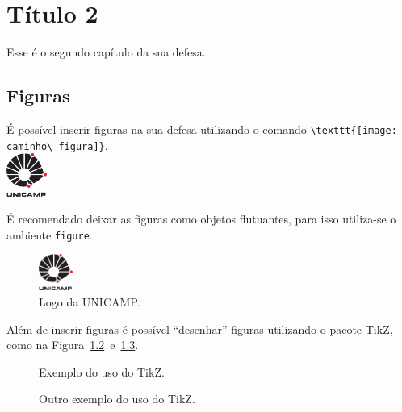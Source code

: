 \chapter{Título 2}
Esse é o segundo capítulo da sua defesa.

\section{Figuras}
É possível inserir figuras na sua defesa utilizando o comando
\lstinline+\texttt{[image: caminho\_figura]}+. \\
\includegraphics[width=0.1\textwidth]{figuras/unicamp-logo}

É recomendado deixar as figuras como objetos flutuantes, para isso
utiliza-se o ambiente \lstinline+figure+.
\begin{figure}[!htb]
  \center
  \includegraphics[width=0.1\textwidth]{figuras/unicamp-logo}
  \caption{Logo da UNICAMP.}
  \label{fig:log_unicamp}
\end{figure}

Além de inserir figuras é possível ``desenhar'' figuras
utilizando o pacote TikZ, como na
Figura~\ref{fig:exem_tikz1}~e~\ref{fig:exem_tikz2}.
\begin{figure}[!htb]
  \centering
  \caption{Exemplo do uso do TikZ.}
  \label{fig:exem_tikz1}
\end{figure}
\begin{figure}[!htb]
  \centering
  \caption{Outro exemplo do uso do TikZ.}
  \label{fig:exem_tikz2}
\end{figure}

